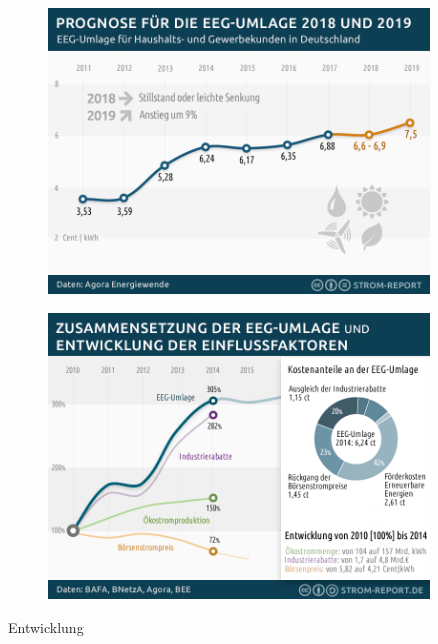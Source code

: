 \documentclass[aspectratio=1610, professionalfonts, 9pt]{beamer}
\begin{document}
{
\begin{frame}
  \begin{figure}
  \includegraphics[width=0.9\textwidth]{images/eeg-umlage-2018-2019.png}
  \end{figure}
\end{frame}
}




{
\begin{frame}
  \begin{figure}
  \includegraphics[width=0.9\textwidth]{images/eeg-umlage.png}
  \end{figure}
\end{frame}
}


\begin{frame}{Entwicklung}

\end{frame}
\end{document}
